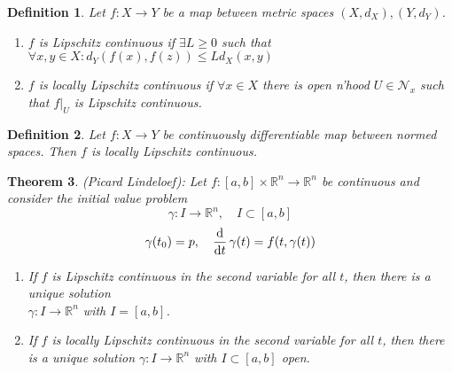 \documentclass{article}
\newtheorem{theorem}{Theorem}
\numberwithin{theorem}{section}
\newtheorem{definition}[theorem]{Definition}
\newtheorem*{remark}{Remark}
\newcommand{\R}{\mathbb{R}}
\newcommand{\1}{\mathds{1}}
\begin{document}
\begin{definition}
    Let $f: X \to Y$ be a map between metric spaces $(X, d_X), (Y, d_Y)$. 
    \begin{enumerate}
        \item $f$ is Lipschitz continuous if $\exists L\geq 0 $ such that $\forall x,y \in X : d_Y(f(x),f(z)) \leq L d_X(x,y) $
        \item $f$ is locally Lipschitz continuous if $\forall x \in X$ there is open n'hood $U \in \mathcal{N}_x$ such that $f|_{U}$ is Lipschitz continuous. 
    \end{enumerate}
\end{definition}
\begin{definition}
    Let $f: X \to Y$ be continuously differentiable map between normed spaces. Then $f$ is locally Lipschitz continuous. 
\end{definition}
\begin{theorem}(Picard Lindeloef):
    Let $f: [a,b]   \times \R^n \to \R^n$ be continuous and consider the initial value problem 
    \[ \gamma: I \to \R^n, \quad I \subset [a,b]\]
    \[ \gamma(t_0) = p, \quad  \dv{}{t}\, \gamma(t) = f(t, \gamma(t)) \]
    \begin{enumerate}
        \item If $f$ is Lipschitz continuous in the second variable for all $t$, then there is a unique solution \\ $\gamma: I \to \R^n$ with $I = [a,b]$. 
        \item If $f$ is locally Lipschitz continuous in the second variable for all $t$, then there is a unique solution $\gamma : I \to \R^n$ with $I \subset [a,b]$ open. 
    \end{enumerate}
    
    
\end{theorem}
\iffalse 
\begin{remark}
    It is important that $I$ is compact, because then $C(I, \R^n) = C^b(I, \R^n)$, making it a Banach space, allowing us to use Banach fixed point theorem. 
\end{remark}\fi 
\end{document}
